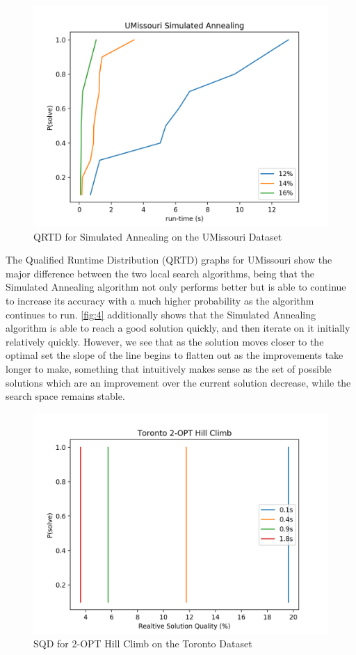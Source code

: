 \documentclass[format=sigconf]{acmart}
\begin{document}
\begin{figure}[htbp]
    \centerline{\includegraphics[scale=.5]{graphs/UMissouri_LS2_QRTD.png}}
    \caption{QRTD for Simulated Annealing on the UMissouri Dataset}
    \label{fig:4}
\end{figure}

The Qualified Runtime Distribution (QRTD) graphs for UMissouri show the major difference between the two local search algorithms, being that the 
Simulated Annealing algorithm not only performs better but is able to continue to increase its accuracy with a much higher 
probability as the algorithm continues to run. \autoref{fig:4} additionally shows that the Simulated Annealing algorithm is able 
to reach a good solution quickly, and then iterate on it initially relatively quickly. However, we see that as the solution moves 
closer to the optimal set the slope of the line begins to flatten out as the improvements take longer to make, something that intuitively makes sense 
as the set of possible solutions which are an improvement over the current solution decrease, while the search space remains stable.
\begin{figure}[htbp]
    \centerline{\includegraphics[scale=.5]{graphs/Toronto_LS1_SQD.png}}
    \caption{SQD for 2-OPT Hill Climb on the Toronto Dataset}
    \label{fig:5}
\end{figure}
\end{document}
